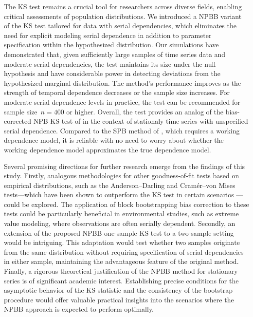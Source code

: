 \documentclass[APA,Times1COL]{WileyNJDv5} %
\begin{document}
The KS test remains a crucial tool for researchers across diverse fields,
enabling critical assessments of population distributions. We introduced a
NPBB variant of the KS test tailored for data with
serial dependencies, which eliminates the need for explicit modeling serial
dependence in addition to parameter specification within the hypothesized
distribution. Our simulations have demonstrated that, given
sufficiently large samples of time series data and moderate serial dependencies,
the test maintains its size under the null hypothesis and have considerable
power in detecting deviations from the hypothesized marginal distribution. The
method's performance improves as the strength of temporal dependence decreases
or the sample size increases. For moderate serial dependence levels in practice,
the test can be recommended for sample size~$n = 400$ or higher.
Overall, the test provides an analog of the bias-corrected NPB KS test of 
\citet{babu2004goodness} in the context of stationaly time
series with unspecified serial dependence. Compared to the SPB method
of \citet{zeimbekakis2022misuses}, which requires a working dependence model, it
is reliable with no need to worry about whether the working dependence
model approximates the true dependence model.


Several promising directions for further research emerge from the findings of
this study. Firstly, analogous methodologies for other goodness-of-fit tests
based on empirical distributions, such as the Anderson--Darling and Cramér--von
Mises tests---which have been shown to outperform the KS test in certain scenarios
\citep{stephens2017tests}---could be explored. The application of block
bootstrapping bias correction to these tests could be particularly beneficial in
environmental studies, such as extreme value modeling, where observations are
often serially dependent. Secondly, an extension of the proposed NPBB
one-sample KS test to a two-sample setting would be
intriguing. This adaptation would test whether two samples originate from the
same distribution without requiring specification of serial dependencies in
either sample, maintaining the advantageous feature of the original method.
Finally, a rigorous theoretical justification of the NPBB method for
stationary series is of significant academic interest. Establishing
precise conditions for the asymptotic behavior of the KS statistic and
the consistency of the bootstrap procedure would offer valuable
practical insights into the scenarios where the NPBB approach is
expected to perform optimally.
\end{document}
